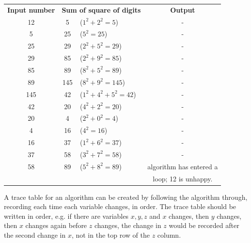         \begin{tabular}{c c l c}
            \textbf{Input number} & \multicolumn{2}{c}{\textbf{Sum of square of digits}} & \textbf{Output} \\
            12 & 5 & ($1^2+2^2=5$) & - \\
            5 & 25 & ($5^2=25$) & - \\
            25 & 29 & ($2^2+5^2=29$) & - \\
            29 & 85 & ($2^2+9^2=85$) & - \\
            85 & 89 & ($8^2+5^2=89$) & - \\
            89 & 145 & ($8^2+9^2=145$) & - \\
            145 & 42 & ($1^2+4^2+5^2=42$) & - \\
            42 & 20 & ($4^2+2^2=20$) & - \\
            20 & 4 & ($2^2+0^2=4$) & - \\
            4 & 16 & ($4^2=16$) & - \\
            16 & 37 & ($1^2+6^2=37$) & - \\
            37 & 58 & ($3^2+7^2=58$) & - \\
            58 & 89 & ($5^2+8^2=89$) & \Gls{algorithm} has entered a \\ &&& loop; 12 is unhappy.
        \end{tabular}

        A trace table for an algorithm can be created by following the algorithm through, recording each time each variable changes, in order.
        The trace table should be written in order, e.g. if there are variables $x,y,z$ and $x$ changes, then $y$ changes, then $x$ changes again before $z$ changes, the change in $z$ would be recorded after the second change in $x$, not in the top row of the $z$ column.

